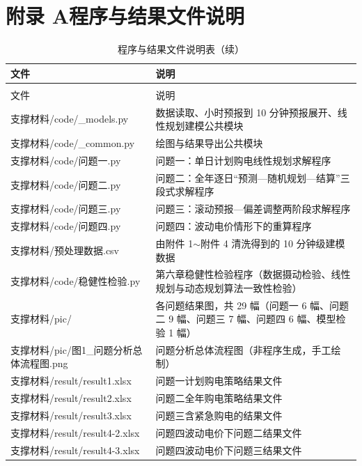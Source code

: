 
\newpage
\makeatletter
\let\@oldaddcontentsline\addcontentsline
\renewcommand{\addcontentsline}[3]{}

\section*{附录 A\quad 程序与结果文件说明}
\let\addcontentsline\@oldaddcontentsline
\makeatother

\renewcommand{\arraystretch}{1.2}
\begin{longtable}{>{\centering\arraybackslash}p{}>{\raggedright\arraybackslash}p{}}
  \caption{程序与结果文件说明表}
  \label{tab:appendix} \\
  \toprule
  文件 & 说明 \\
  \midrule
  \endfirsthead
  \caption{程序与结果文件说明表（续）} \\
  \toprule
  文件 & 说明 \\
  \midrule
  \endhead
  \bottomrule
  \endfoot
  支撑材料/code/\_models.py & 数据读取、小时预报到 10 分钟预报展开、线性规划建模公共模块 \\
  支撑材料/code/\_common.py & 绘图与结果导出公共模块 \\
  支撑材料/code/问题一.py & 问题一：单日计划购电线性规划求解程序 \\
  支撑材料/code/问题二.py & 问题二：全年逐日“预测—随机规划—结算”三段式求解程序 \\
  支撑材料/code/问题三.py & 问题三：滚动预报—偏差调整两阶段求解程序 \\
  支撑材料/code/问题四.py & 问题四：波动电价情形下的重算程序 \\
  支撑材料/预处理数据.csv & 由附件 1$\sim$附件 4 清洗得到的 10 分钟级建模数据 \\
  支撑材料/code/稳健性检验.py & 第六章稳健性检验程序（数据摄动检验、线性规划与动态规划算法一致性检验） \\
  支撑材料/pic/ & 各问题结果图，共 29 幅（问题一 6 幅、问题二 9 幅、问题三 7 幅、问题四 6 幅、模型检验 1 幅） \\
  支撑材料/pic/图1\_问题分析总体流程图.png & 问题分析总体流程图（非程序生成，手工绘制） \\
  支撑材料/result/result1.xlsx & 问题一计划购电策略结果文件 \\
  支撑材料/result/result2.xlsx & 问题二全年购电策略结果文件 \\
  支撑材料/result/result3.xlsx & 问题三含紧急购电的结果文件 \\
  支撑材料/result/result4-2.xlsx & 问题四波动电价下问题二结果文件 \\
  支撑材料/result/result4-3.xlsx & 问题四波动电价下问题三结果文件 \\
\end{longtable}

